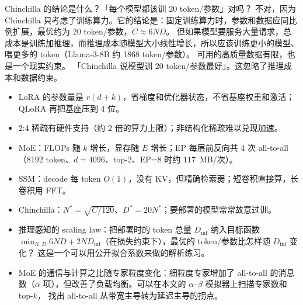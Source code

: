 \begin{qa}{Chinchilla 的结论是什么？「每个模型都该训 20 token/参数」对吗？}
\ans 不对，因为 Chinchilla 只考虑了训练算力。它的结论是：固定训练算力时，参数和数据应同比例扩展，最优约为 20 token/参数，$C\approx6ND$。
但如果模型要服务大量请求，总成本是训练加推理，而推理成本随模型大小线性增长，所以应该训练更小的模型、喂更多的 token（Llama-3-8B 约 1868 token/参数）。
可用的高质量数据有限，也是一个现实约束。
\wrong 「Chinchilla 说模型训 20 token/参数最好」。这忽略了推理成本和数据约束。
\end{qa}

\begin{keypts}
\begin{itemize}
\item LoRA 的参数量是 $r(d+k)$，省梯度和优化器状态，不省基座权重和激活；QLoRA 再把基座压到 4 位。
\item 2:4 稀疏有硬件支持（约 2 倍的算力上限）；非结构化稀疏难以兑现加速。
\item MoE：FLOPs 随 $k$ 增长，显存随 $E$ 增长；EP 每层前反向共 4 次 all-to-all（8192 token、$d=4096$、top-2、EP=8 时约 117~MB/次）。
\item SSM：decode 每 token $O(1)$，没有 KV，但精确检索弱；短卷积直接算，长卷积用 FFT。
\item Chinchilla：$N^\ast=\sqrt{C/120}$、$D^\ast=20N^\ast$；要部署的模型常常故意过训。
\end{itemize}
\end{keypts}

\begin{research}
\begin{itemize}
\item 推理感知的 scaling law：把部署时的 token 总量 $D_{\text{inf}}$ 纳入目标函数 $\min_{N,D}6ND+2ND_{\text{inf}}$（在损失约束下），最优的 token/参数比怎样随 $D_{\text{inf}}$ 变化？
这是一个可以用公开拟合系数来做的解析练习。
\item MoE 的通信与计算之比随专家粒度变化：细粒度专家增加了 all-to-all 的消息数（$\alpha$ 项），但改善了负载均衡。可以在本文的 $\alpha$--$\beta$ 模拟器上扫描专家数和 top-$k$，
找出 all-to-all 从带宽主导转为延迟主导的拐点。
\end{itemize}
\end{research}

